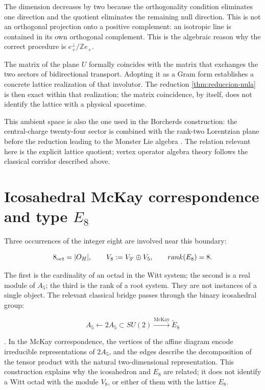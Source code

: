 The dimension decreases by two because the orthogonality condition eliminates
one direction and the quotient eliminates the remaining null direction. This is not
an orthogonal projection onto a positive complement: an
isotropic line is contained in its own orthogonal complement. This is the algebraic reason
why the correct procedure is \(e_+^\perp/\mathbb Ze_+\).

The matrix of the plane \(U\) formally coincides with the matrix that exchanges
the two sectors of bidirectional transport. Adopting it as a Gram form
establishes a concrete lattice realization of that involutor. The reduction
\cref{thm:reduccion-nula} is then exact within that realization;
the matrix coincidence, by itself, does not identify the lattice with a
physical spacetime.

This ambient space is also the one used in the Borcherds construction: the
central-charge twenty-four sector is combined with the rank-two Lorentzian
plane before the reduction leading to the Monster Lie algebra
\cite{Borcherds1992}. The relation relevant here is the explicit lattice
quotient; vertex operator algebra theory follows the classical corridor
described above.


\section{Icosahedral McKay correspondence and type \texorpdfstring{\(E_8\)}{E8}}
\label{sec:tres-ochos}

Three occurrences of the integer eight are involved near this boundary:

\[
8_{\rm oct}=|O_H|,
\qquad
V_8:=V_{3'}\oplus V_5,
\qquad
\operatorname{rank}(E_8)=8.
\]

The first is the cardinality of an octad in the Witt system; the second is
a real module of \(A_5\); the third is the rank of a root system. They are not
instances of a single object. The relevant classical bridge passes through the
binary icosahedral group:

\[
A_5\longleftarrow2A_5\subset SU(2)
\xrightarrow{\text{McKay}}\widetilde E_8
\]

\cite{McKay1980}. In the McKay correspondence, the vertices of the affine
diagram encode irreducible representations of \(2A_5\), and the edges
describe the decomposition of the tensor product with the natural
two-dimensional representation. This construction explains why the icosahedron and
\(E_8\) are related; it does not identify a Witt octad with the module
\(V_8\), or either of them with the lattice \(E_8\).

